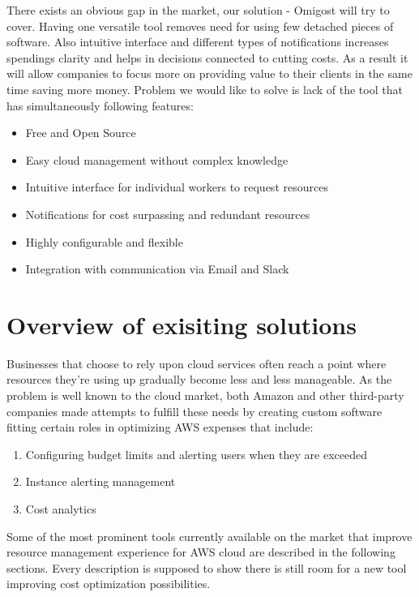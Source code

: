 \documentclass[licencjacka,en]{thesisclass}
\begin{document}
    There exists an obvious gap in the market, our solution - Omigost will try to cover. Having one versatile tool removes need for using few detached pieces of software. Also intuitive interface and different types of notifications increases spendings clarity and helps in decisions connected to cutting costs. As a result it will allow companies to focus more on providing value to their clients in the same time saving more money.
    Problem we would like to solve is lack of the tool that has simultaneously following features:
    \begin{itemize}
        \item Free and Open Source
        \item Easy cloud management without complex knowledge
        \item Intuitive interface for individual workers to request resources
        \item Notifications for cost surpassing and redundant resources
        \item Highly configurable and flexible
        \item Integration with communication via Email and Slack
    \end{itemize}

    \section{Overview of exisiting solutions}

    Businesses that choose to rely upon cloud services often reach a point where resources
    they're using up gradually become less and less manageable.
    As the problem is well known to the cloud market, both Amazon and other third-party companies made attempts
    to fulfill these needs by creating custom software fitting certain roles in optimizing AWS expenses that include:

    \begin{enumerate}
        \item Configuring budget limits and alerting users when they are exceeded
        \item Instance alerting management
        \item Cost analytics
    \end{enumerate}

    Some of the most prominent tools currently available on the market that improve resource management experience for AWS cloud are described in the following sections. Every description is supposed to show there is still room for a new tool improving cost optimization possibilities.
\end{document}
